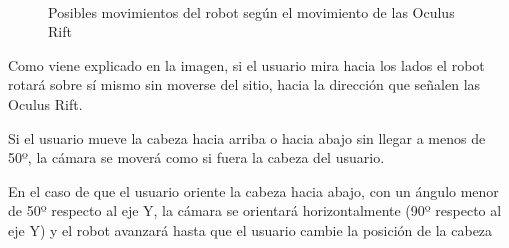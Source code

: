 \documentclass[twoside, 12pt]{epstfg}
\begin{document}
\begin{figure}[h]
	\centering
	\\
	\caption{Posibles movimientos del robot según el movimiento de las Oculus Rift} \label{movRobot}
\end{figure}

Como viene explicado en la imagen, si el usuario mira hacia los lados el robot rotará sobre sí mismo sin moverse del sitio, hacia la dirección que señalen las Oculus Rift.

Si el usuario mueve la cabeza hacia arriba o hacia abajo sin llegar a menos de 50º, la cámara se moverá como si fuera la cabeza del usuario.

En el caso de que el usuario oriente la cabeza hacia abajo, con un ángulo menor de 50º respecto al eje Y, la cámara se orientará horizontalmente (90º respecto al eje Y) y el robot avanzará hasta que el usuario cambie la posición de la cabeza
\end{document}
